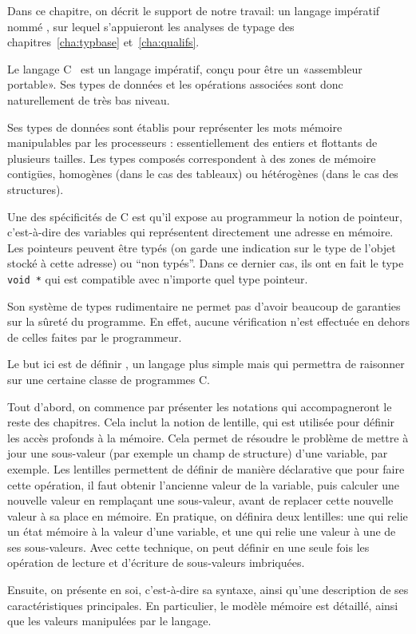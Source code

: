 Dans ce chapitre, on décrit le support de notre travail: un langage impératif
nommé \langname, sur lequel s'appuieront les analyses de typage des
chapitres~\ref{cha:typbase} et~\ref{cha:qualifs}.

Le langage C~\cite{KandR} est un langage impératif, conçu pour être un
«assembleur portable». Ses types de données et les opérations associées sont
donc naturellement de très bas niveau.

Ses types de données sont établis pour représenter les mots mémoire manipulables
par les processeurs : essentiellement des entiers et flottants de plusieurs
tailles. Les types composés correspondent à des zones de mémoire contigües,
homogènes (dans le cas des tableaux) ou hétérogènes (dans le cas des
structures).

Une des spécificités de C est qu'il expose au programmeur la notion de pointeur,
c'est-à-dire des variables qui représentent directement une adresse en mémoire.
Les pointeurs peuvent être typés (on garde une indication sur le type de l'objet
stocké à cette adresse) ou ``non typés''. Dans ce dernier cas, ils ont en fait
le type \texttt{void *} qui est compatible avec n'importe quel type pointeur.

Son système de types rudimentaire ne permet pas d'avoir beaucoup de garanties
sur la sûreté du programme. En effet, aucune vérification n'est effectuée en
dehors de celles faites par le programmeur.

Le but ici est de définir \langname, un langage plus simple mais qui permettra
de raisonner sur une certaine classe de programmes C.

Tout d'abord, on commence par présenter les notations qui accompagneront le
reste des chapitres. Cela inclut la notion de lentille, qui est utilisée pour
définir les accès profonds à la mémoire. Cela permet de résoudre le problème de
mettre à jour une sous-valeur (par exemple un champ de structure) d'une
variable, par exemple. Les lentilles permettent de définir de manière
déclarative que pour faire cette opération, il faut obtenir l'ancienne valeur de
la variable, puis calculer une nouvelle valeur en remplaçant une sous-valeur,
avant de replacer cette nouvelle valeur à sa place en mémoire. En pratique, on
définira deux lentilles: une qui relie un état mémoire à la valeur d'une
variable, et une qui relie une valeur à une de ses sous-valeurs. Avec cette
technique, on peut définir en une seule fois les opération de lecture et
d'écriture de sous-valeurs imbriquées.

Ensuite, on présente \langname en soi, c'est-à-dire sa syntaxe, ainsi qu'une
description de ses caractéristiques principales. En particulier, le modèle
mémoire est détaillé, ainsi que les valeurs manipulées par le langage.

